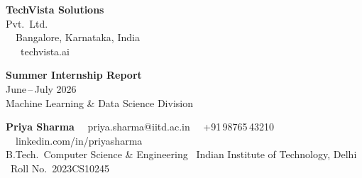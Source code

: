 \documentclass[11pt,a4paper]{article}
\begin{document}
{
\vspace*{-8pt}
\begin{tcolorbox}[
    enhanced,
    colframe=white,
    colback=white,
    borderline north={3.5pt}{0pt}{accent},
    borderline south={0.6pt}{0pt}{rulecolor},
    left=4pt, right=4pt, top=10pt, bottom=14pt,
    before skip=0pt, after skip=18pt
]
\begin{minipage}[t]{0.58\linewidth}
    {\LARGE\bfseries\color{accent}TechVista Solutions}\\[3pt]
    {\large\color{accentlight}Pvt.\ Ltd.}\\[8pt]
    {\footnotesize\color{rulecolor}%
    \faMapMarker\ \ Bangalore, Karnataka, India\\
    \faGlobe\ \ \ techvista.ai}
\end{minipage}
\hfill
\begin{minipage}[t]{0.38\linewidth}
    \raggedleft
    {\large\bfseries\color{accent}Summer Internship Report}\\[3pt]
    {\normalsize\color{textdark}June\,--\,July 2026}\\[10pt]
    {\footnotesize\color{rulecolor}%
    Machine Learning \& Data Science Division}
\end{minipage}
\end{tcolorbox}
}

{
\begin{tcolorbox}[
    enhanced,
    colframe=accent,
    colback=accent!4,
    boxrule=0.8pt,
    arc=3pt,
    left=14pt, right=14pt, top=10pt, bottom=10pt,
    before skip=0pt, after skip=16pt
]
{\bfseries\large\color{accent} Priya Sharma}
\hfill
{\small\faEnvelope\ \ priya.sharma@iitd.ac.in \quad
 \faPhone\ \ +91\,98765\,43210 \quad
 \faLinkedin\ \ linkedin.com/in/priyasharma}\\[4pt]
{\footnotesize\color{rulecolor}%
B.Tech.\ Computer Science \& Engineering \textbar\ Indian Institute of Technology, Delhi \textbar\ Roll No.\ 2023CS10245}
\end{tcolorbox}
}










\end{document}
